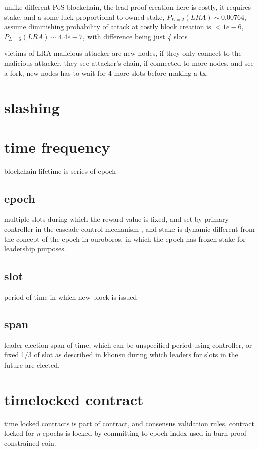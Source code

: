 \documentclass{article}
\begin{document}
\item unlike different PoS blockchain, the lead proof creation here is costly, it requires stake, and a some luck proportional to owned stake, $P_{L=2}(LRA) \sim 0.00764$, assume diminishing probability of attack at costly block creation is $\lt 1e-6$, $P_{L=6}(LRA) \sim 4.4e-7$, with difference being just \emph{4} slots

\item victims of LRA malicious attacker are new nodes, if they only connect to the malicious attacker, they see attacker's chain, if connected to more nodes, and see a fork, new nodes has to wait for 4 more slots before making a tx.

  \section{slashing}


\section {time frequency}
blockchain lifetime is series of epoch


\subsection {epoch}
multiple slots during which the reward value is fixed, and set by primary controller in the cascade control mechanism \cite{cascade}, and stake is dynamic different from the concept of the epoch in ouroboros, in which the epoch has frozen stake for leadership purposes.

\subsection {slot}
period of time in which new block is issued

\subsection {span}
leader election span of time, which can be unspecified period using controller, or fixed 1/3 of slot as described in khonsu \cite{khonsu} during which leaders for slots in the future are elected.

\section {timelocked contract}
time locked contracts is part of contract, and consensus validation rules, contract locked for \emph{n} epochs is locked by committing to epoch index used in burn proof constrained coin.
\end{document}

